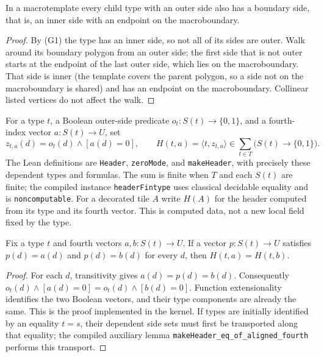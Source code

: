 \begin{lemma}
\label{lem:comp/outer-boundary}
In a macrotemplate every child type with an outer side also has a boundary
side, that is, an inner side with an endpoint on the macroboundary.
\end{lemma}
\begin{proof}
By (G1) the type has an inner side, so not all of its sides are outer.
Walk around its boundary polygon from an outer side; the first side that
is not outer starts at the endpoint of the last outer side, which lies on
the macroboundary. That side is inner (the template covers the parent
polygon, so a side not on the macroboundary is shared) and has an endpoint
on the macroboundary. Collinear listed vertices do not affect the walk.
\end{proof}

\begin{definition}
\label{def:control/header}
\leanok
{}
For a type $t$, a Boolean outer-side predicate $o_t:S(t)\to\{0,1\}$,
and a fourth-index vector $a:S(t)\to U$, set
\[
 z_{t,a}(d)=o_t(d)\mathbin{\wedge}[a(d)=0],\qquad
 H(t,a)=\bigl\langle t,z_{t,a}\bigr\rangle
 \in\sum_{t\in T}\bigl(S(t)\to\{0,1\}\bigr).
\]
The Lean definitions are \texttt{Header}, \texttt{zeroMode}, and
\texttt{makeHeader}, with precisely these dependent types and formulas.
The sum is finite when $T$ and each $S(t)$ are finite; the compiled instance
\texttt{headerFintype} uses classical decidable equality and is
\texttt{noncomputable}. For a decorated tile $A$ write $H(A)$ for the header
computed from its type and its fourth vector. This is computed data, not a
new local field fixed by the type.
\end{definition}

\begin{lemma}
\label{lem:comp/port-recovery}
\leanok
{}
Fix a type $t$ and fourth vectors $a,b:S(t)\to U$. If a vector
$p:S(t)\to U$ satisfies $p(d)=a(d)$ and $p(d)=b(d)$ for every $d$, then
$H(t,a)=H(t,b)$.
\end{lemma}
\begin{proof}
 \leanok
For each $d$, transitivity gives $a(d)=p(d)=b(d)$. Consequently
$o_t(d)\wedge[a(d)=0]=o_t(d)\wedge[b(d)=0]$. Function extensionality
identifies the two Boolean vectors, and their type components are already
the same. This is the proof implemented in the kernel. If types are initially
identified by an equality $t=s$, their dependent side sets must first be
transported along that equality; the compiled auxiliary lemma
\texttt{makeHeader\_eq\_of\_aligned\_fourth} performs this transport.
\end{proof}

